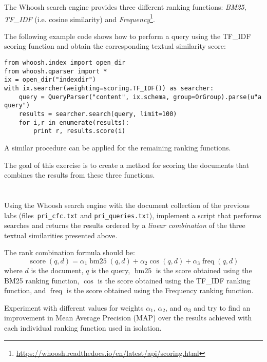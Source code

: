 \documentclass[12pt]{article}
\begin{document}

The Whoosh search engine provides three different ranking functions: \emph{BM25}, \emph{TF\_IDF} (i.e. cosine similarity) and \emph{Frequency}\footnote{\url{https://whoosh.readthedocs.io/en/latest/api/scoring.html}}. 

The following example code shows how to perform a query using the
TF\_IDF scoring function and obtain the corresponding textual similarity score:
\begin{verbatim}
from whoosh.index import open_dir
from whoosh.qparser import *
ix = open_dir("indexdir")
with ix.searcher(weighting=scoring.TF_IDF()) as searcher:
    query = QueryParser("content", ix.schema, group=OrGroup).parse(u"a query")
    results = searcher.search(query, limit=100)
    for i,r in enumerate(results):
        print r, results.score(i)
\end{verbatim}
A similar procedure can be applied for the remaining ranking functions.

The goal of this exercise is to create a method for scoring the documents that combines the results from these three functions.

\section{}

Using the Whoosh search engine with the document collection of the previous labs (files~\texttt{pri\_cfc.txt} and \texttt{pri\_queries.txt}), implement a script that performs searches and returns the results ordered by a \emph{linear combination} of the three textual similarities presented above.

The rank combination formula should be:
\begin{displaymath}
    \operatorname{score}(q,d) = \alpha_1\operatorname{bm25}(q,d) + \alpha_2\operatorname{cos}(q,d) + \alpha_3\operatorname{freq}(q,d)
\end{displaymath}
where $d$ is the document, $q$ is the query, $\operatorname{bm25}$ is the score obtained using the BM25 ranking function, $\operatorname{cos}$ is the score obtained using the TF\_IDF ranking function, and $\operatorname{freq}$ is the score obtained using the Frequency ranking function.

Experiment with different values for weights $\alpha_1$, $\alpha_2$, and $\alpha_3$ and try to find an improvement in Mean Average Precision (MAP) over the results achieved with each individual ranking function used in isolation.
\end{document}
